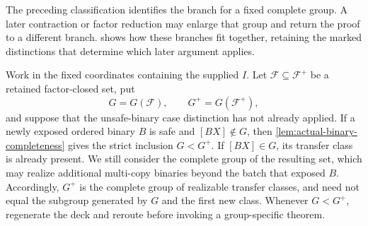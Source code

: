 \documentclass[11pt,letterpaper,onecolumn]{article}
\theoremstyle{plain}
\theoremstyle{definition}
\theoremstyle{remark}
\newcommand{\cF}{\mathcal F}
\begin{document}
The preceding classification identifies the branch for a fixed complete
group. A later contraction or factor reduction may enlarge that group and
return the proof to a different branch. 
shows how these branches fit together, retaining the marked distinctions
that determine which later argument applies.

Work in the fixed coordinates containing the supplied \(I\).  Let
\(\cF\subseteq\cF^+\) be a retained factor-closed set,
put
\[
 G=G(\cF),\qquad G^+=G(\cF^+),
\]
and suppose that the unsafe-binary case distinction has not already applied.  If a
newly exposed ordered binary \(B\) is safe and \([BX]\notin G\), then
\cref{lem:actual-binary-completeness} gives the strict inclusion
\(G<G^+\).  If \([BX]\in G\), its transfer class is already present. We still
consider the complete group of the resulting set, which may realize
additional multi-copy binaries beyond the batch that exposed \(B\).
Accordingly, \(G^+\) is the complete group of realizable transfer classes, and need not equal
the subgroup generated by \(G\) and the first new class.  Whenever
\(G<G^+\), regenerate the deck and reroute before invoking a
group-specific theorem.
\end{document}
